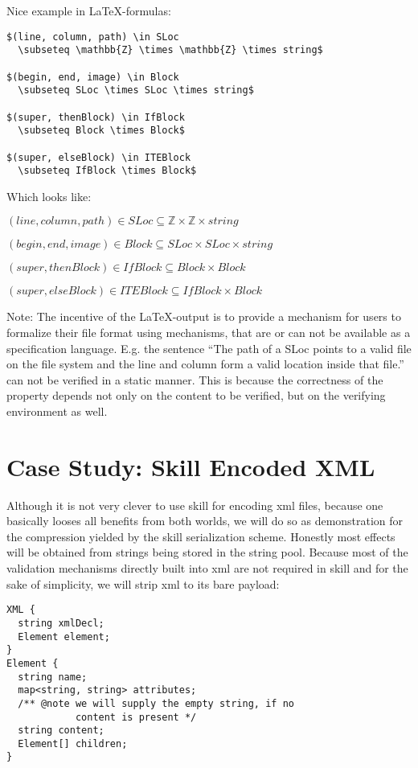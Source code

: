 \documentclass[a4paper,10pt]{article}
\begin{document}
Nice example in \LaTeX-formulas:
\begin{verbatim}
$(line, column, path) \in SLoc
  \subseteq \mathbb{Z} \times \mathbb{Z} \times string$

$(begin, end, image) \in Block
  \subseteq SLoc \times SLoc \times string$

$(super, thenBlock) \in IfBlock
  \subseteq Block \times Block$

$(super, elseBlock) \in ITEBlock
  \subseteq IfBlock \times Block$
\end{verbatim}
Which looks like:

$(line, column, path) \in SLoc \subseteq \mathbb{Z} \times \mathbb{Z} \times string$

$(begin, end, image) \in Block \subseteq SLoc \times SLoc \times string$

$(super, thenBlock) \in IfBlock \subseteq Block \times Block$

$(super, elseBlock) \in ITEBlock \subseteq IfBlock \times Block$

Note: The incentive of the \LaTeX-output is to provide a mechanism for users to formalize their file format using mechanisms, that are or can not be available as a specification language. E.g. the sentence ``The path of a SLoc points to a valid file on the file system and the line and column form a valid location inside that file.'' can not be verified in a static manner. This is because the correctness of the property depends not only on the content to be verified, but on the verifying environment as well.

\section{Case Study: Skill Encoded XML}
Although it is not very clever to use skill for encoding xml files, because one basically looses all benefits from both worlds, we will do so as demonstration for the compression yielded by the skill serialization scheme. Honestly most effects will be obtained from strings being stored in the string pool. Because most of the validation mechanisms directly built into xml are not required in skill and for the sake of simplicity, we will strip xml to its bare payload:
\begin{lstlisting}[label=sex,caption=Skill Encoded XML]
XML {
  string xmlDecl;
  Element element;
}
Element {
  string name;
  map<string, string> attributes;
  /** @note we will supply the empty string, if no
            content is present */
  string content;
  Element[] children;
}
\end{lstlisting}
\end{document}
